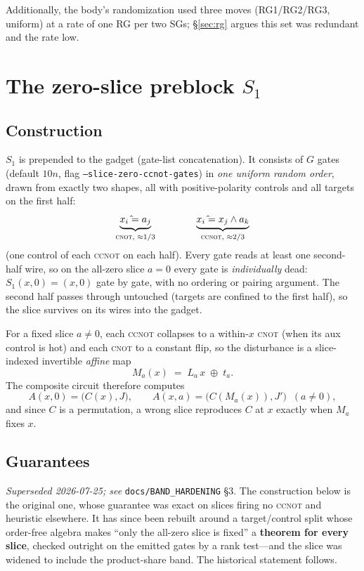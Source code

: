 \documentclass[11pt]{article}
\newcommand{\CNOT}{\textsc{cnot}}
\newcommand{\CCNOT}{\textsc{ccnot}}
\newcommand{\code}[1]{\texttt{#1}}
\newcommand{\Sone}{S_1}
\begin{document}
Additionally, the body's randomization used three moves (RG1/RG2/RG3,
uniform) at a rate of one RG per two SGs; \S\ref{sec:rg} argues this set was
redundant and the rate low.

\section{The zero-slice preblock $\Sone$}

\subsection{Construction}

$\Sone$ is prepended to the gadget (gate-list concatenation). It consists of
$G$ gates (default $10n$, flag \code{--slice-zero-ccnot-gates}) in
\emph{one uniform random order}, drawn from exactly two shapes, all with
positive-polarity controls and all targets on the first half:
\[
\underbrace{x_i \mathrel{\hat{}}= a_j}_{\text{\CNOT, } \approx 1/3}
\qquad\qquad
\underbrace{x_i \mathrel{\hat{}}= x_j \wedge a_k}_{\text{\CCNOT, } \approx 2/3}
\]
(one control of each \CCNOT{} on each half). Every gate reads at least one
second-half wire, so on the all-zero slice $a=0$ every gate is
\emph{individually} dead: $\Sone(x,0)=(x,0)$ gate by gate, with no ordering
or pairing argument. The second half passes through untouched (targets are
confined to the first half), so the slice survives on its wires into the
gadget.

For a fixed slice $a\neq 0$, each \CCNOT{} collapses to a within-$x$ \CNOT{}
(when its aux control is hot) and each \CNOT{} to a constant flip, so the
disturbance is a slice-indexed invertible \emph{affine} map
\[
M_a(x) \;=\; L_a\,x \;\oplus\; t_a .
\]
The composite circuit therefore computes
\[
A(x, 0) = \bigl(C(x), J\bigr), \qquad
A(x, a) = \bigl(C(M_a(x)), J'\bigr) \;\; (a \neq 0),
\]
and since $C$ is a permutation, a wrong slice reproduces $C$ at $x$ exactly
when $M_a$ fixes $x$.

\subsection{Guarantees}

\emph{Superseded 2026-07-25; see} \texttt{docs/BAND\_HARDENING} \S3. The
construction below is the original one, whose guarantee was exact on slices
firing no \CCNOT{} and heuristic elsewhere. It has since been rebuilt around a
target/control split whose order-free algebra makes ``only the all-zero slice
is fixed'' a \textbf{theorem for every slice}, checked outright on the emitted
gates by a rank test---and the slice was widened to include the product-share
band. The historical statement follows.
\end{document}
